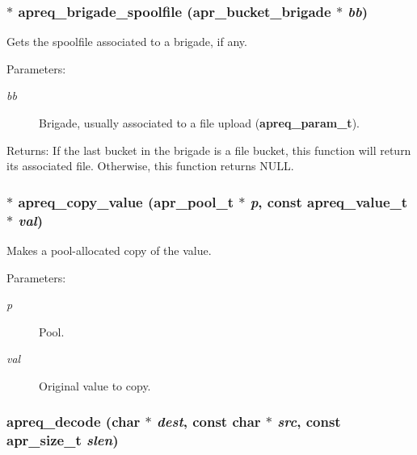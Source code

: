 \subsubsection{$\ast$ apreq\_\-brigade\_\-spoolfile ({\bf apr\_\-bucket\_\-brigade} $\ast$ {\em bb})}\label{group__Utils_a20}


Gets the spoolfile associated to a brigade, if any. \begin{Desc}
\item[Parameters:]
\begin{description}
\item[{\em bb}]Brigade, usually associated to a file upload ({\bf apreq\_\-param\_\-t}). \end{description}
\end{Desc}
\begin{Desc}
\item[Returns:]If the last bucket in the brigade is a file bucket, this function will return its associated file. Otherwise, this function returns NULL. \end{Desc}
\subsubsection{$\ast$ apreq\_\-copy\_\-value ({\bf apr\_\-pool\_\-t} $\ast$ {\em p}, const {\bf apreq\_\-value\_\-t} $\ast$ {\em val})}\label{group__Utils_a4}


Makes a pool-allocated copy of the value. \begin{Desc}
\item[Parameters:]
\begin{description}
\item[{\em p}]Pool. \item[{\em val}]Original value to copy. \end{description}
\end{Desc}
\subsubsection{ apreq\_\-decode (char $\ast$ {\em dest}, const char $\ast$ {\em src}, const {\bf apr\_\-size\_\-t} {\em slen})}\label{group__Utils_a12}


